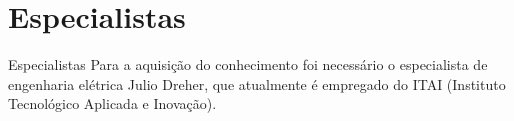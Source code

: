 \renewcommand{\titulo}{Especialistas}
\section{\titulo}
\begin{frame}{\titulo}
Para a aquisição do conhecimento foi necessário o especialista de engenharia elétrica Julio Dreher, que atualmente é empregado do ITAI (Instituto Tecnológico Aplicada e Inovação).
\end{frame}

